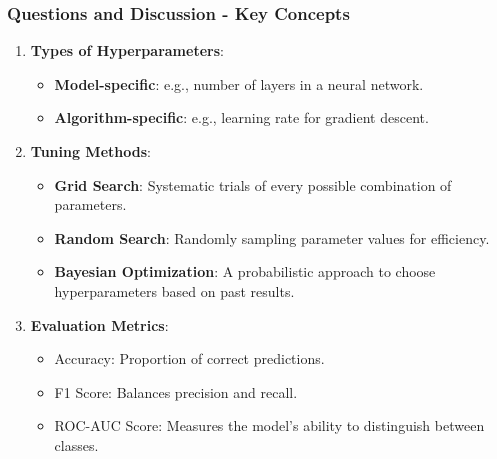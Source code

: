 \documentclass[aspectratio=169]{beamer}
\begin{document}
\begin{frame}[fragile]
  \frametitle{Questions and Discussion - Key Concepts}
  
  \begin{enumerate}
    \item \textbf{Types of Hyperparameters}:
    \begin{itemize}
      \item \textbf{Model-specific}: e.g., number of layers in a neural network.
      \item \textbf{Algorithm-specific}: e.g., learning rate for gradient descent.
    \end{itemize}
    
    \item \textbf{Tuning Methods}:
    \begin{itemize}
      \item \textbf{Grid Search}: Systematic trials of every possible combination of parameters.
      \item \textbf{Random Search}: Randomly sampling parameter values for efficiency.
      \item \textbf{Bayesian Optimization}: A probabilistic approach to choose hyperparameters based on past results.
    \end{itemize}
    
    \item \textbf{Evaluation Metrics}:
    \begin{itemize}
      \item Accuracy: Proportion of correct predictions.
      \item F1 Score: Balances precision and recall.
      \item ROC-AUC Score: Measures the model's ability to distinguish between classes.
    \end{itemize}
  \end{enumerate}
\end{frame}
\end{document}
